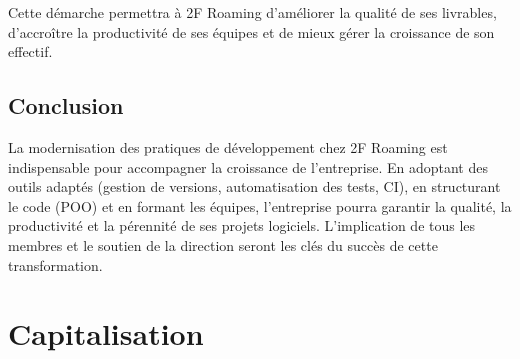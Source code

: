 Cette démarche permettra à 2F Roaming d'améliorer la qualité de ses livrables, d'accroître la productivité de ses équipes et de mieux gérer la croissance de son effectif.



\subsection*{Conclusion}
{}

La modernisation des pratiques de développement chez 2F Roaming est indispensable pour accompagner la croissance de l'entreprise. En adoptant des outils adaptés (gestion de versions, automatisation des tests, CI), en structurant le code (POO) et en formant les équipes, l'entreprise pourra garantir la qualité, la productivité et la pérennité de ses projets logiciels. L'implication de tous les membres et le soutien de la direction seront les clés du succès de cette transformation.

\newpage

\section*{Capitalisation}

